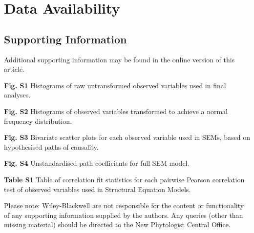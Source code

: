 \documentclass[11pt,a4paper]{article}
\begin{document}
\section{Data Availability}



\vspace{0.5cm}

\begin{minipage}{\linewidth}
\begin{framed}
\section*{Supporting Information}

Additional supporting information may be found in the online version of this article.
\vspace{0.2cm}

\textbf{Fig. S1} Histograms of raw untransformed observed variables used in final analyses.
\vspace{0.2cm}

\textbf{Fig. S2} Histograms of observed variables transformed to achieve a normal frequency distribution.
\vspace{0.2cm}

\textbf{Fig. S3} Bivariate scatter plots for each observed variable used in SEMs, based on hypothesised paths of causality.
\vspace{0.2cm}

\textbf{Fig. S4} Unstandardised path coefficients for full SEM model.
\vspace{0.2cm}

\textbf{Table S1} Table of correlation fit statistics for each pairwise Pearson correlation test of observed variables used in Structural Equation Models.
\vspace{0.2cm}

Please note: Wiley-Blackwell are not responsible for the content or functionality of any supporting information supplied by the authors. Any queries (other than missing material) should be directed to the New Phytologist Central Office.
\end{framed}
\end{minipage}
\end{document}
